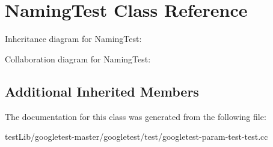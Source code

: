 \hypertarget{classNamingTest}{}\section{Naming\+Test Class Reference}
\label{classNamingTest}


Inheritance diagram for Naming\+Test\+:


Collaboration diagram for Naming\+Test\+:
\subsection*{Additional Inherited Members}


The documentation for this class was generated from the following file\+:\begin{DoxyCompactItemize}
\item 
test\+Lib/googletest-\/master/googletest/test/googletest-\/param-\/test-\/test.\+cc\end{DoxyCompactItemize}
